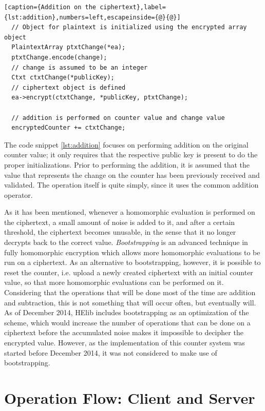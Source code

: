 \begin{lstlisting}[caption={Addition on the ciphertext},label={lst:addition},numbers=left,escapeinside={@}{@}]
  // Object for plaintext is initialized using the encrypted array object
  PlaintextArray ptxtChange(*ea);
  ptxtChange.encode(change); 
  // change is assumed to be an integer
  Ctxt ctxtChange(*publicKey); 
  // ciphertext object is defined 
  ea->encrypt(ctxtChange, *publicKey, ptxtChange);

  // addition is performed on counter value and change value
  encryptedCounter += ctxtChange;
\end{lstlisting}

The code snippet \ref{lst:addition} focuses on performing addition on the original counter value; it only requires that the respective public key is present to do the proper initializations. Prior to performing the addition, it is assumed that the value that represents the change on the counter has been previously received and validated. The operation itself is quite simply, since it uses the common addition operator. 

As it has been mentioned, whenever a homomorphic evaluation is performed on the ciphertext, a small amount of noise is added to it, and after a certain threshold, the ciphertext becomes unusable, in the sense that it no longer decrypts back to the correct value. \emph{Bootstrapping} is an advanced technique in fully homomorphic encryption which allows more homomorphic evaluations to be run on a ciphertext. As an alternative to bootstrapping, however, it is possible to reset the counter, i.e. upload a newly created ciphertext with an initial counter value, so that more homomorphic evaluations can be performed on it.  Considering that the operations that will be done most of the time are addition and subtraction, this is not something that will occur often, but eventually will. As of December 2014, HElib includes bootstrapping as an optimization of the scheme, which would increase the number of operations that can be done on a ciphertext before the accumulated noise makes it impossible to decipher the encrypted value. However, as the implementation of this counter system was started before December 2014, it was not considered to make use of bootstrapping.

\section{{Operation Flow: Client and Server}}

